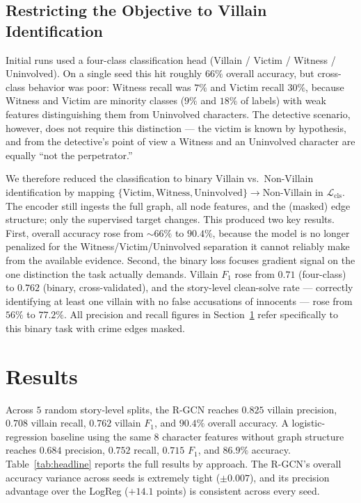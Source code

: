 \documentclass[11pt]{article}
\begin{document}
\subsection{Restricting the Objective to Villain Identification}
Initial runs used a four-class classification head (Villain / Victim / Witness / Uninvolved). On a single seed this hit roughly $66\%$ overall accuracy, but cross-class behavior was poor: Witness recall was $7\%$ and Victim recall $30\%$, because Witness and Victim are minority classes ($9\%$ and $18\%$ of labels) with weak features distinguishing them from Uninvolved characters. The detective scenario, however, does not require this distinction --- the victim is known by hypothesis, and from the detective's point of view a Witness and an Uninvolved character are equally ``not the perpetrator.''

We therefore reduced the classification to binary Villain vs.~Non-Villain identification by mapping $\{\text{Victim}, \text{Witness}, \text{Uninvolved}\} \to \text{Non-Villain}$ in $\mathcal{L}_{\text{cls}}$. The encoder still ingests the full graph, all node features, and the (masked) edge structure; only the supervised target changes. This produced two key results. First, overall accuracy rose from $\sim\!66\%$ to $90.4\%$, because the model is no longer penalized for the Witness/Victim/Uninvolved separation it cannot reliably make from the available evidence. Second, the binary loss focuses gradient signal on the one distinction the task actually demands. Villain $F_1$ rose from $0.71$ (four-class) to $0.762$ (binary, cross-validated), and the story-level clean-solve rate --- correctly identifying at least one villain with no false accusations of innocents --- rose from $56\%$ to $77.2\%$. All precision and recall figures in Section~\ref{sec:results} refer specifically to this binary task with crime edges masked.

\section{Results}
\label{sec:results}

Across $5$ random story-level splits, the R-GCN reaches $0.825$ villain precision, $0.708$ villain recall, $0.762$ villain $F_1$, and $90.4\%$ overall accuracy. A logistic-regression baseline using the same $8$ character features without graph structure reaches $0.684$ precision, $0.752$ recall, $0.715$ $F_1$, and $86.9\%$ accuracy. Table~\ref{tab:headline} reports the full results by approach. The R-GCN's overall accuracy variance across seeds is extremely tight ($\pm 0.007$), and its precision advantage over the LogReg ($+14.1$ points) is consistent across every seed.
\end{document}
